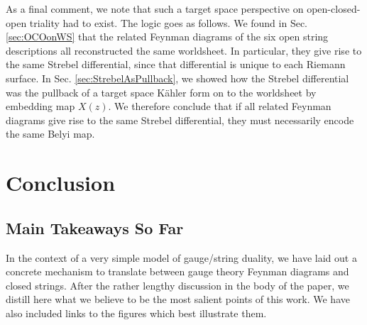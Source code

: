 \documentclass[english]{article}
\renewcommand{\>}{\rangle}
\newcommand{\<}{\langle}
\renewcommand{\(}{\left(}
\renewcommand{\)}{\right)}
\begin{document}
As a final comment, we note that such a target space perspective on open-closed-open triality had to exist. The logic goes as follows. We found in Sec. \ref{sec:OCOonWS} that the related Feynman diagrams of the six open string descriptions all reconstructed the same worldsheet. In particular, they give rise to the same Strebel differential, since that differential is unique to each Riemann surface. In Sec. \ref{sec:StrebelAsPullback}, we showed how the Strebel differential was the pullback of a target space Kähler form on to the worldsheet by embedding map $X(z)$. We therefore conclude that if all related Feynman diagrams give rise to the same Strebel differential, they must necessarily encode the same Belyi map.


\pagebreak













\section{Conclusion}

\subsection{Main Takeaways So Far} \label{sec:Takeaways}
In the context of a very simple model of gauge/string duality, we have laid out a concrete mechanism to translate between gauge theory Feynman diagrams and closed strings. After the rather lengthy discussion in the body of the paper, we distill here what we believe to be the most salient points of this work. We have also included links to the figures which best illustrate them.
\end{document}
